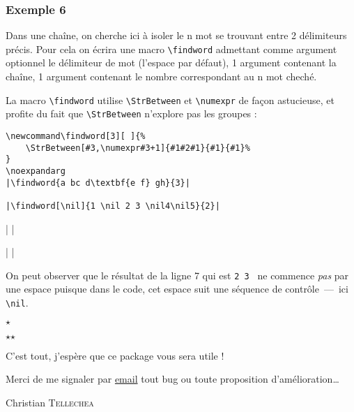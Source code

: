 \documentclass[a4paper,10pt]{article}
\newcommand\styleexercice{\footnotesize}
\newcommand\verbinline{\lstinline[basicstyle=\normalsize\ttfamily]}
\begin{document}
\subsubsection{Exemple 6}
Dans une chaîne, on cherche ici à isoler le n\ieme{} mot se trouvant entre 2 délimiteurs précis. Pour cela on écrira une macro \verb|\findword| admettant comme argument optionnel le délimiteur de mot (l'espace par défaut), 1 argument contenant la chaîne, 1 argument contenant le nombre correspondant au n\ieme{} mot cheché.\medskip

La macro \verb|\findword| utilise \verbinline|\StrBetween| et \verb|\numexpr| de façon astucieuse, et profite du fait que \verbinline-\StrBetween- n'explore pas les groupes :\par\nobreak\medskip
\begin{minipage}[c]{0.65\linewidth}
\begin{lstlisting}
\newcommand\findword[3][ ]{%
	\StrBetween[#3,\numexpr#3+1]{#1#2#1}{#1}{#1}%
}
\noexpandarg
|\findword{a bc d\textbf{e f} gh}{3}|

|\findword[\nil]{1 \nil 2 3 \nil4\nil5}{2}|
\end{lstlisting}%
\end{minipage}\hfill
\begin{minipage}[c]{0.35\linewidth}
	\styleexercice
	\newcommand\findword[3][ ]{%
		\StrBetween[#3,\numexpr#3+1]{#1#2#1}{#1}{#1}%
	}
	\noexpandarg
	|\findword{a bc d\textbf{e f} gh}{3}|

	|\findword[\nil]{1 \nil 2 3 \nil4\nil5}{2}|
\end{minipage}%

On peut observer que le résultat de la ligne 7 qui est \og\verb*|2 3 |\fg{} ne commence \emph{pas} par une espace puisque dans le code, cet espace suit une séquence de contrôle~---~ici \verb|\nil|.
\bigskip\bigskip
\begin{center}
$\star$\par
$\star$\quad$\star$
\end{center}
\bigskip\bigskip

C'est tout, j'espère que ce package vous sera utile !\par\nobreak
Merci de me signaler par \href{mailto:unbonpetit@gmail.com}{email} tout bug ou toute proposition d'amélioration\ldots\par\nobreak\bigskip
Christian \textsc{Tellechea}
\end{document}
